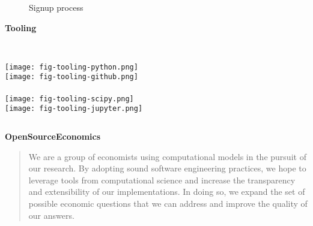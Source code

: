 \begin{frame}
\begin{figure}[htp]\centering
\caption{Signup process}
\end{figure}
\end{frame}
\begin{frame}\textbf{Tooling}\vspace{0.5cm}
\begin{columns}[t]
	\centering \\
	\texttt{[image: fig-tooling-python.png]}\\
	\vspace{1.5cm}
	\texttt{[image: fig-tooling-github.png]} \\
	\vspace{-0.5cm}
	\centering \\
	\texttt{[image: fig-tooling-scipy.png]} \\
	\vspace{1cm}
	\texttt{[image: fig-tooling-jupyter.png]} \\
	\vspace{-0.2cm}
\end{columns}
\end{frame}
\begin{frame}\textbf{OpenSourceEconomics}\vspace{0.5cm}

\begin{center}\begin{quote}
We are a group of economists using computational models in the pursuit of our research. By adopting sound software engineering practices, we hope to leverage tools from computational science and increase the transparency and extensibility of our implementations. In doing so, we expand the set of possible economic questions that we can address and improve the quality of our answers.
\end{quote}\end{center}
\end{frame}

